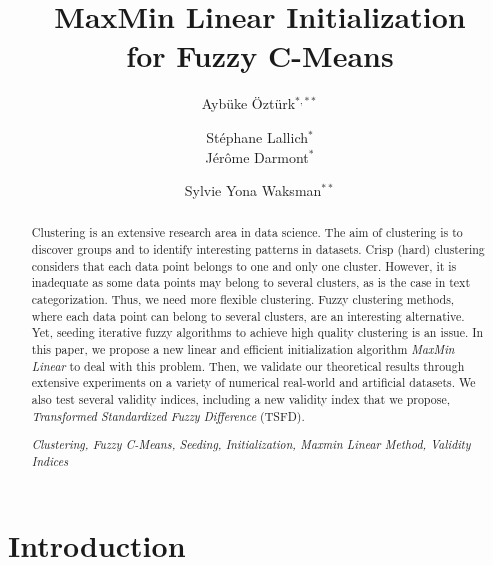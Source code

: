 \documentclass[runningheads,a4paper]{llncs}
\newcommand{\keywords}[1]{\par\addvspace\baselineskip
\noindent\keywordname\enspace\ignorespaces#1}
\begin{document}
\mainmatter  %

\title{MaxMin Linear Initialization \\ for Fuzzy C-Means}
\author{Ayb\"uke \"Ozt\"urk$^{*, **}$
\and  St\'ephane Lallich$^{*}$ \\
J\'er\^{o}me Darmont$^{*}$ 
\and Sylvie Yona Waksman$^{**}$}

\maketitle

\begin{abstract}

Clustering is an extensive research area in data science. The aim of clustering is to discover groups and to identify interesting patterns in datasets. Crisp (hard) clustering considers that each data point belongs to one and only one cluster. However, it is inadequate as some data points may belong to several clusters, as is the case in text categorization. Thus, we need more flexible clustering. Fuzzy clustering methods, where each data point can belong to several clusters, are an interesting alternative. Yet, seeding iterative fuzzy algorithms to achieve high quality clustering is an issue. In this paper, we propose a new linear and efficient initialization algorithm \textit{MaxMin Linear} to deal with this problem. Then, we validate our theoretical results through extensive experiments on a variety of numerical real-world and artificial datasets. We also test several validity indices, including a new validity index that we propose, \textit{Transformed Standardized Fuzzy Difference} (TSFD). 

\keywords{\textit{Clustering, Fuzzy C-Means, Seeding, Initialization, Maxmin Linear Method, Validity Indices}}
\end{abstract}

\section{Introduction}
\end{document}
